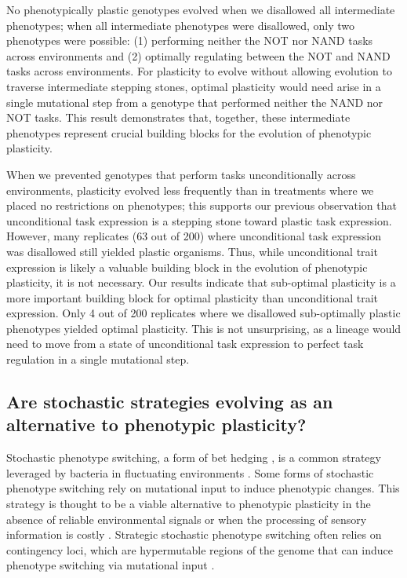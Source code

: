 No phenotypically plastic genotypes evolved when we disallowed all intermediate phenotypes; when all intermediate phenotypes were disallowed, only two phenotypes were possible: (1) performing neither the NOT nor NAND tasks across environments and (2) optimally regulating between the NOT and NAND tasks across environments.
For plasticity to evolve without allowing evolution to traverse intermediate stepping stones, optimal plasticity would need arise in a single mutational step from a genotype that performed neither the NAND nor NOT tasks.
This result demonstrates that, together, these intermediate phenotypes represent crucial building blocks for the evolution of phenotypic plasticity. 

When we prevented genotypes that perform tasks unconditionally across environments, plasticity evolved less frequently than in treatments where we placed no restrictions on phenotypes; this supports our previous observation that unconditional task expression is a stepping stone toward plastic task expression. However, many replicates (63 out of 200) where unconditional task expression was disallowed still yielded plastic organisms. Thus, while unconditional trait expression is likely a valuable building block in the evolution of phenotypic plasticity, it is not necessary. Our results indicate that sub-optimal plasticity is a more important building block for optimal plasticity than unconditional trait expression. Only 4 out of 200 replicates where we disallowed sub-optimally plastic phenotypes yielded optimal plasticity. This is not unsurprising, as a lineage would need to move from a state of unconditional task expression to perfect task regulation in a single mutational step.

\subsection{Are stochastic strategies evolving as an alternative to phenotypic plasticity?}

Stochastic phenotype switching, a form of bet hedging \citep{seger_what_1987}, is a common strategy leveraged by bacteria in fluctuating environments \citep{rainey_evolutionary_2011}. 
Some forms of stochastic phenotype switching rely on mutational input to induce phenotypic changes. 
This strategy is thought to be a viable alternative to phenotypic plasticity in the absence of reliable environmental signals or when the processing of sensory information is costly \citep{rainey_evolutionary_2011}.
Strategic stochastic phenotype switching often relies on contingency loci, which are hypermutable regions of the genome that can induce phenotype switching via mutational input \citep{moxon_bacterial_2006}. 

